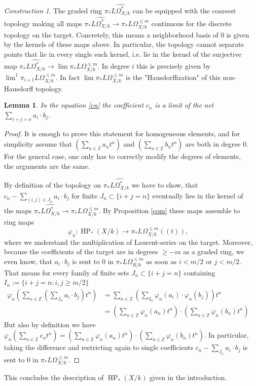 \documentclass[10pt, reqno]{amsart}
\newtheorem{lemma}[theorem]{Lemma}
\theoremstyle{definition}
\theoremstyle{remark}
\newtheorem{construction}[theorem]{Construction}
\newcommand{\Z}{\mathbb{Z}}
\newcommand{\dr}[3]{\Omega^{#3}_{#1/#2}}
\newcommand{\llrrpar}[1]{(\!(#1)\!)}
\DeclareMathOperator{\HP}{\mathrm{HP}}
\begin{document}
\begin{construction}
The graded ring $\pi_*\widehat{L\dr Xk*}$ can be equipped with the coarsest topology making all maps $\pi_*\widehat{L\dr Xk*}\to\pi_*L\dr Xk{\leq m}$ continuous for the discrete topology on the target. Concretely, this means a neighborhood basis of 0 is given by the kernels of these maps above. In particular, the topology cannot separate points that lie in every single such kernel, i.e. lie in the kernel of the surjective map $\pi_*\widehat{L\dr Xk*}\to\lim \pi_*L\dr Xk{\leq m}$. In degree $i$ this is precisely given by $\lim^1\pi_{i+1}L\dr Xk{\leq m}$. In fact $\lim\pi_*L\dr Xk{\leq m}$ is the "Hausdorffization" of this non-Hausdorff topology.
\end{construction}

\begin{lemma}
	In the equation \eqref{cn} the coefficient $c_n$ is a limit of the net $\sum_{i+j=n}a_i\cdot b_j$.
\end{lemma}
\begin{proof}
	It is enough to prove this statement for homogeneous elements, and for simplicity assume that $(\sum_{n\in\Z}a_nt^n)$ and $(\sum_{n\in\Z}b_nt^n)$ are both in degree 0. For the general case, one only has to correctly modify the degrees of elements, the arguments are the same.
	
	By definition of the topology on $\pi_*\widehat{L\dr Xk*}$ we have to show, that $c_n-\sum_{(i,j)\in{J_n}}a_i\cdot b_j$ for finite $J_n\subset\{i+j=n\}$ eventually lies in the kernel of the maps $\pi_*\widehat{L\dr Xk*}\to\pi_*L\dr Xk{\leq m}$. By Proposition \ref{com} these maps assemble to ring maps 
	\[\varphi_n\colon\HP_*(X/k)\to \pi_*L\dr Xk{\leq m}\llrrpar t,\]
	where we understand the multiplication of Laurent-series on the target. Moreover, because the coefficients of the target are in degrees $\geq -m$ as a graded ring, we even know, that $a_i\cdot b_j$ is sent to 0 in $\pi_*L\dr Rk{\leq m}$ as soon as $i<m/2$ or $j<m/2$. That means for every family of finite sets $J_n\subset\{i+j=n\}$ containing $I_n:=\{i+j=n:i,j\geq m/2\}$
	\begin{align*}\varphi_n\left(\sum_{n\in\Z}\left(\sum_{J_n}a_i\cdot b_j\right)t^n\right)&=\sum_{n\in\Z}\left(\sum_{I_n}\varphi_n(a_i)\cdot\varphi_n(b_j)\right)t^n\\
	&=\left(\sum_{n\in\Z}\varphi_n(a_n)t^n\right)\cdot\left(\sum_{n\in\Z}\varphi_n(b_n)t^n\right)\end{align*}
	But also by definition we have $\varphi_n\left(\sum_{n\in\Z}c_nt^n\right)=\left(\sum_{n\in\Z}\varphi_n(a_n)t^n\right)\cdot\left(\sum_{n\in\Z}\varphi_n(b_n)t^n\right)$. In particular, taking the difference and restricting again to single coefficients $c_n-\sum_{J_n}a_i\cdot b_j$ is sent to 0 in $\pi_*L\dr Xk{\leq m}$.
\end{proof}
This concludes the description of $\HP_*(X/k)$ given in the introduction.
\appendix
\end{document}
